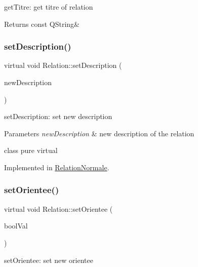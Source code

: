 get\+Titre\+: get titre of relation 

\begin{DoxyReturn}{Returns}
const Q\+String\& 
\end{DoxyReturn}
\mbox{\label{class_relation_a8f698cc45c38a849c4bcd8336fa5e2b3}} 
\subsubsection{\texorpdfstring{set\+Description()}{setDescription()}}
{\footnotesize\ttfamily virtual void Relation\+::set\+Description (\begin{DoxyParamCaption}\item[{const Q\+String \&}]{new\+Description }\end{DoxyParamCaption})\hspace{0.3cm}{\ttfamily [pure virtual]}}



set\+Description\+: set new description 


\begin{DoxyParams}{Parameters}
{\em new\+Description} & new description of the relation\\
\hline
\end{DoxyParams}
class pure virtual 

Implemented in \hyperlink{class_relation_normale_a74c586177c06279726df02dd1d8b721a}{Relation\+Normale}.

\mbox{\label{class_relation_a5c93cf0ba3f16e75b83f3683b5ac26ec}} 
\subsubsection{\texorpdfstring{set\+Orientee()}{setOrientee()}}
{\footnotesize\ttfamily virtual void Relation\+::set\+Orientee (\begin{DoxyParamCaption}\item[{bool}]{bool\+Val }\end{DoxyParamCaption})\hspace{0.3cm}{\ttfamily [pure virtual]}}



set\+Orientee\+: set new orientee 


